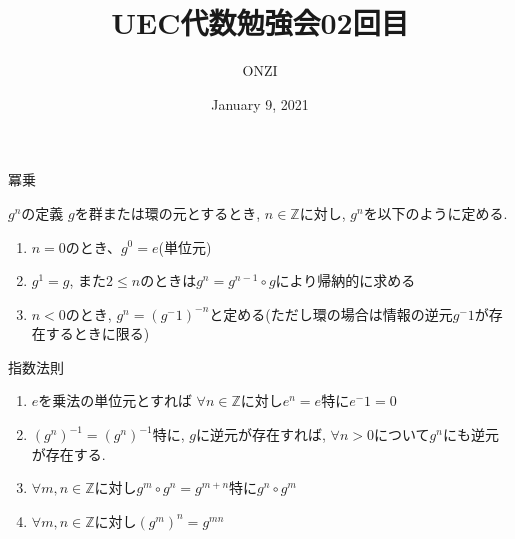 \documentclass[dvipdfmx,11pt,notheorems]{beamer}
\title{UEC代数勉強会02回目}
\author{ONZI}
\date{January 9, 2021}
\begin{document}
\maketitle
\begin{frame}{冪乗}
  \begin{block}{$g^n$の定義}
  $g$を群または環の元とするとき, $n \in \mathbb{Z}$に対し, $g^n$を以下のように定める.
  \begin{enumerate}
   \item $n=0$のとき、$g^0=e$(単位元) \\
   \item $g^1 = g$, また$2 \le n$のときは$g^n = g^{n-1} \circ g$により帰納的に求める\\
   \item $n < 0$のとき, $g^n = (g^-1)^{-n}$と定める(ただし環の場合は情報の逆元$g^-1$が存在するときに限る)
  \end{enumerate}
\end{block}

\begin{alertblock}{指数法則}
    \begin{enumerate}
      \item $e$を乗法の単位元とすれば $\forall n \in \mathbb{Z}$に対し$e^n = e$特に$e^-1 = 0$
      \item $(g^n)^{-1} = (g^n)^{-1}$特に, $g$に逆元が存在すれば, $\forall n > 0$について$g^n$にも逆元が存在する.
      \item $\forall m, n \in \mathbb{Z}$に対し$g^m \circ g^n = g^{m+n}$特に$g^n \circ g^m$
      \item $\forall m, n \in \mathbb{Z}$に対し$(g^m)^n = g^{mn}$
    \end{enumerate}
  \end{alertblock}
\end{frame}
\end{document}
